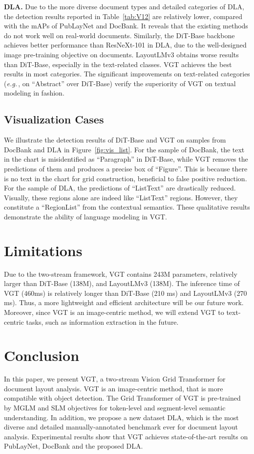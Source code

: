 \documentclass[10pt,twocolumn,letterpaper]{article}
\def\eg{\emph{e.g.}\,}
\begin{document}
\noindent
\textbf{DLA.} 
Due to the more diverse document types and detailed categories of DLA,
the detection results reported in Table~\ref{tab:V12} are relatively lower, compared with the mAPs of PubLayNet and DocBank.
It reveals that the existing methods do not work well on real-world documents.
Similarly, the DiT-Base backbone achieves better performance than ResNeXt-101 in DLA,
due to the well-designed image pre-training objective on documents.
LayoutLMv3 obtains worse results than DiT-Base, especially in the text-related classes.
VGT achieves the best results in most categories. 
The significant improvements on text-related categories (\eg,  on ``Abstract'' over DiT-Base)
verify the superiority of VGT on textual modeling in  fashion.


\subsection{Visualization Cases}
We illustrate the detection results of DiT-Base and VGT on samples from DocBank and  DLA in Figure~\ref{fig:vis_list}. For the sample of DocBank, the text in the chart is misidentified as ``Paragraph'' in DiT-Base, while VGT removes the predictions of them and produces a precise box of ``Figure''.
This is because there is no text in the chart for grid construction, beneficial to false positive reduction. For the sample of DLA, the predictions of ``ListText'' are drastically reduced.
Visually, these regions alone are indeed like ``ListText'' regions.
However, they constitute a ``RegionList'' from the contextual semantics.
These qualitative results demonstrate the ability of  language modeling in VGT.

\section{Limitations}
Due to the two-stream framework, VGT contains 243M parameters, 
relatively larger than DiT-Base (138M), and LayoutLMv3 (138M).
The inference time of VGT (460ms) is relatively longer than DiT-Base (210 ms) and LayoutLMv3 (270 ms).
Thus, a more lightweight and efficient architecture will be our future work.
Moreover, since VGT is an image-centric method, we will extend VGT to text-centric tasks, such as information extraction in the future.


\section{Conclusion}
In this paper, we present VGT, a two-stream Vision Grid Transformer for document layout analysis.
VGT is an image-centric method, that is more compatible with object detection.
The Grid Transformer of VGT is pre-trained by MGLM and SLM objectives
for  token-level and segment-level semantic understanding.
In addition, we propose a new dataset DLA, which is the most diverse and detailed manually-annotated benchmark ever for document layout analysis.
Experimental results show that VGT achieves state-of-the-art results on PubLayNet, DocBank and the proposed DLA.
\end{document}
